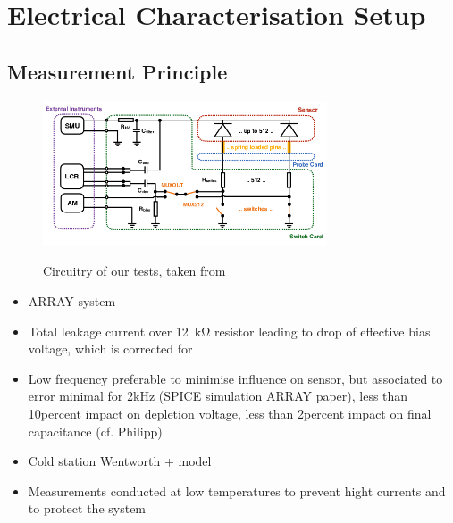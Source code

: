 \section{Electrical Characterisation Setup}
\label{sec:setup}

\subsection{Measurement Principle}
\label{subsec:setup_principle}
\begin{figure}[h]
	\centering
	\includegraphics[width=0.75\textwidth]{figures/circuit_cards_updated.png}
	\label{fig:switchprobecard_CAD}
	\caption{
		Circuitry of our tests, taken from~\cite{pitters:array2019}
	}
\end{figure}


\begin{itemize}
	\item ARRAY system~\cite{pitters:array2019}
	\item Total leakage current over \SI{12}{\kilo\ohm} resistor leading to drop of effective bias voltage, which is corrected for
	\item Low frequency preferable to minimise influence on sensor, but associated to error minimal for 2kHz (SPICE simulation ARRAY paper), less than 10percent impact on depletion voltage, less than 2percent impact on final capacitance (cf. Philipp)
\end{itemize}

\begin{itemize}
	\item Cold station Wentworth + model
	\item Measurements conducted at low temperatures to prevent hight currents and to protect the system
\end{itemize}




